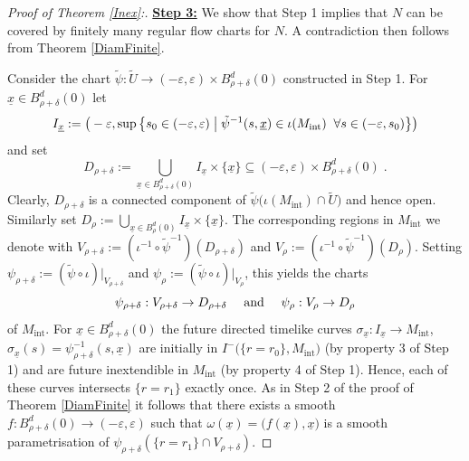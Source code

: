 \documentclass[reqno]{article}
\newcommand{\ux}{\underline{x}}
\newcommand{\Mint}{M_{\mathrm{int}}}
\begin{document}
\begin{proof}[Proof of Theorem \ref{Inex}:]
\underline{\textbf{Step 3:}} We show that Step 1 implies that $N$ can be covered by finitely many regular flow charts for $N$. A contradiction then follows from Theorem \ref{DiamFinite}.
\vspace*{5mm}

Consider the chart $\tilde{\psi} : \tilde{U} \to (-\varepsilon, \varepsilon) \times B^d_{\rho + \delta} (0)$ constructed in Step 1. For $\underline{x} \in B^d_{\rho + \delta}(0)$ let \begin{equation*}
I_{\underline{x}} := \big(- \varepsilon , \sup \big{\{} s_0 \in (-\varepsilon, \varepsilon) \; \big| \; \tilde{\psi}^{-1} (s,\underline{x}) \in \iota(\Mint) \;\; \forall  s \in (-\varepsilon, s_0)\big{\}}\big)
\end{equation*}
and set 
\begin{equation*}
D_{\rho + \delta} := \bigcup_{\underline{x} \in B^d_{\rho + \delta}(0)} I_{\ux} \times \{ \ux\} \subseteq (-\varepsilon, \varepsilon) \times B^d_{\rho + \delta}(0)\;.
\end{equation*} 
Clearly, $D_{\rho + \delta}$ is a connected component of $\tilde{\psi}\big(\iota(\Mint) \cap \tilde{U}\big)$ and hence open. Similarly set $D_\rho := \bigcup_{\underline{x} \in B^d_{\rho}(0)} I_{\ux} \times \{ \ux\}$. The corresponding regions in $\Mint$ we denote with $V_{\rho + \delta} := (\iota^{-1} \circ \tilde{\psi}^{-1})(D_{\rho + \delta})$ and $V_\rho := (\iota^{-1} \circ \tilde{\psi}^{-1})(D_{\rho})$. Setting $\psi_{\rho + \delta} := (\tilde{\psi} \circ \iota)|_{V_{\rho + \delta}}$ and $\psi_\rho := (\tilde{\psi} \circ \iota)|_{V_\rho}$, this yields the charts
\begin{equation*}
\psi_{\rho + \delta} : V_{\rho + \delta} \to D_{\rho + \delta} \quad \textnormal{ and } \quad \psi_{\rho} : V_{\rho} \to D_{\rho } 
\end{equation*}
of $\Mint$.  For $\ux \in B^d_{\rho + \delta}(0)$ the future directed timelike curves $\sigma_{\ux} : I_{\ux} \to \Mint$, $\sigma_{\ux}(s) = \psi^{-1}_{\rho + \delta}(s, \ux)$ are initially in $I^-\big(\{r = r_0\}, \Mint\big)$ (by property 3 of Step 1) and are future inextendible in $\Mint$ (by property 4 of Step 1). Hence, each of these curves intersects $\{r = r_1\}$ exactly once. As in Step 2 of the proof of Theorem \ref{DiamFinite} it follows that there exists a smooth $f : B^d_{\rho + \delta}(0) \to (-\varepsilon, \varepsilon)$ such that $\omega(\ux) = \big(f(\ux), \ux\big)$ is a smooth parametrisation of $\psi_{\rho + \delta}(\{r = r_1\} \cap V_{\rho + \delta})$. 


\end{proof}
\end{document}
